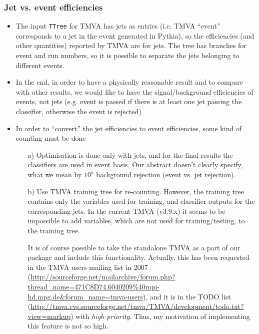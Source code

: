 \subsubsection{Jet vs. event efficiencies}

\begin{itemize}
\item The input \texttt{TTree} for TMVA has jets as entries (i.e. TMVA
  ``event'' corresponds to a jet in the event generated in Pythia), so
  the efficiencies (and other quantities) reported by TMVA are for
  jets. The tree has branches for event and run numbers, so it is
  possible to separate the jets belonging to different events.
\item In the end, in order to have a physically reasonable result and
  to compare with other results, we would like to have the
  signal/background efficiencies of events, not jets (e.g. event is
  passed if there is at least one jet passing the classifier,
  otherwise the event is rejected)
\item In order to ``convert'' the jet efficiencies to event
  efficiencies, some kind of counting must be done
  \begin{enumerate}
  \item[a)] Optimisation is done only with jets, and for the final
    results the classifiers are used in event basis. Our abstract
    doesn't clearly specify, what we mean by $10^5$ background
    rejection (event vs. jet rejection).

  \item[b)] Use TMVA training tree for re-counting. However, the
    training tree contains only the variables used for training, and
    classifier outputs for the corresponding jets. In the current TMVA
    (v3.9.x) it seems to be impossible to add variables, which are not
    used for training/testing, to the training tree.

    It is of course possible to take the standalone TMVA as a part of
    our package and include this functionality. Actually, this has
    been requested in the TMVA users mailing list in 2007
    (\url{http://sourceforge.net/mailarchive/forum.php?thread_name=471C8D74.6040209\%40mpi-hd.mpg.de\&forum_name=tmva-users}),
    and it is in the TODO list
    (\url{http://tmva.cvs.sourceforge.net/tmva/TMVA/development/todo.txt?view=markup})
    with \emph{high priority}. Thus, my motivation of implementing
    this feature is not so high.


\end{enumerate}
\end{itemize}
